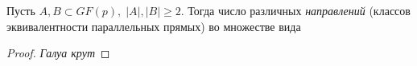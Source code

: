 \documentclass{article}
\newenvironment{theorem}[2][Теорема]{\begin{trivlist}
\item[\hskip \labelsep {\bfseries #1}\hskip \labelsep {\bfseries #2.}]}{\end{trivlist}}
\begin{document}
\begin{theorem}{(Tamas Szonyi, 1994)}

\end{theorem}

\begin{theorem}{(Benedetto, Solymosi, White, 2020)}
Пусть $A,B\subset GF(p),\; {|A|},{|B|}\ge 2$. Тогда число различных \emph{направлений} (классов эквивалентности параллельных прямых) во множестве вида 
\end{theorem}

\begin{proof}
\emph{Галуа крут}
\end{proof}
\end{document}
